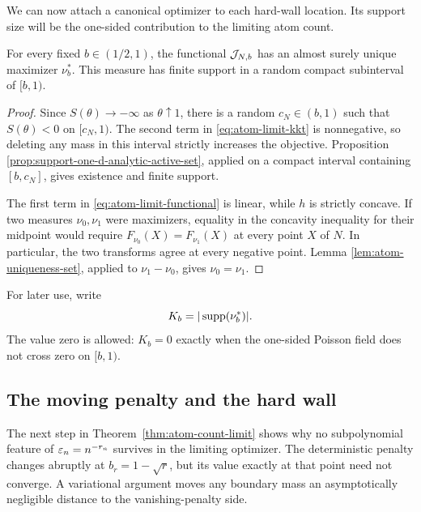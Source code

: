 We can now attach a canonical optimizer to each hard-wall location. Its
support size will be the one-sided contribution to the limiting atom count.
\begin{proposition}
\label{prop:atom-limit-unique}
For every fixed \(b\in(1/2,1)\), the functional \(\mathcal J_{N,b}\) has an almost
surely unique maximizer \(\nu_b^*\). This measure has finite support in a
random compact subinterval of \([b,1)\).
\end{proposition}

\begin{proof}
Since \(S(\theta)\to-\infty\) as \(\theta\uparrow1\), there is a random
\(c_N\in(b,1)\) such that \(S(\theta)<0\) on \([c_N,1)\). The second term in
\eqref{eq:atom-limit-kkt} is nonnegative, so deleting any mass in this
interval strictly increases the objective. Proposition
\ref{prop:support-one-d-analytic-active-set}, applied on a compact interval
containing \([b,c_N]\), gives existence and finite support.

The first term in \eqref{eq:atom-limit-functional} is linear, while \(h\) is
strictly concave. If two measures \(\nu_0,\nu_1\) were maximizers, equality
in the concavity inequality for their midpoint would require
\(F_{\nu_0}(X)=F_{\nu_1}(X)\) at every point \(X\) of \(N\). In particular,
the two transforms agree at every negative point. Lemma
\ref{lem:atom-uniqueness-set}, applied to \(\nu_1-\nu_0\), gives
\(\nu_0=\nu_1\).
\end{proof}

For later use, write
\[
    K_b=|\operatorname{supp}(\nu_b^*)|.
\]
The value zero is allowed: \(K_b=0\) exactly when the one-sided Poisson field
does not cross zero on \([b,1)\).

\subsection{The moving penalty and the hard wall}

The next step in Theorem~\ref{thm:atom-count-limit} shows why no
subpolynomial feature of \(\varepsilon_n=n^{-r_n}\) survives in the limiting
optimizer. The deterministic penalty changes abruptly at
\(b_r=1-\sqrt r\), but its value exactly at that point need not converge.
A variational argument moves any boundary mass an asymptotically negligible
distance to the vanishing-penalty side.

